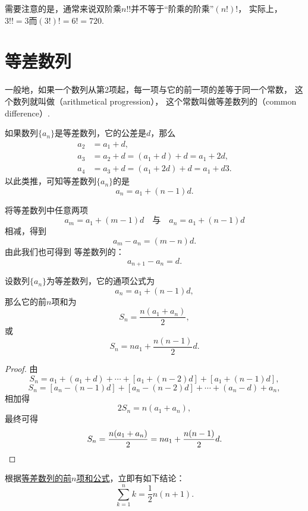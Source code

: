 需要注意的是，通常来说双阶乘\(n!!\)并不等于“阶乘的阶乘”\((n!)!\)，
实际上，\(3!! = 3\)而\((3!)! = 6! = 720\).

\section{等差数列}
一般地，如果一个数列从第2项起，每一项与它的前一项的差等于同一个常数，
这个数列就叫做（arithmetical progression），
这个常数叫做等差数列的（common difference）.

如果数列\(\{a_n\}\)是等差数列，它的公差是\(d\)，那么\begin{align*}
    a_2 &= a_1 + d, \\
    a_3 &= a_2 + d = (a_1 + d) + d = a_1 + 2d, \\
    a_4 &= a_3 + d = (a_1 + 2d) + d = a_1 + d3.
\end{align*}
以此类推，可知等差数列\(\{a_n\}\)的是\begin{equation}
    a_n = a_1 + (n-1) d.
\end{equation}

将等差数列中任意两项\[
    a_m = a_1 + (m-1) d
    \quad\text{与}\quad
    a_n = a_1 + (n-1) d
\]相减，得到\[
    a_m - a_n = (m-n) d.
\]
由此我们也可得到%
等差数列的：\begin{equation}
    a_{n+1} - a_n = d.
\end{equation}

\begin{property}[等差数列求和]
设数列\(\{a_n\}\)为等差数列，它的通项公式为\[
    a_n = a_1 + (n-1) d,
\]
那么它的前\(n\)项和为\begin{equation}\label{equation:数列.等差数列的前n项和1}
    S_n = \frac{n(a_1 + a_n)}{2},
\end{equation}
或\begin{equation}\label{equation:数列.等差数列的前n项和2}
    S_n = n a_1 + \frac{n(n-1)}{2} d.
\end{equation}
\begin{proof}
由\[
    S_n = a_1 + (a_1 + d) + \dotsb + [a_1 + (n-2)d] + [a_1 + (n-1)d],
\]\[
    S_n = [a_n - (n-1)d] + [a_n - (n-2)d] + \dotsb + (a_n - d) + a_n,
\]相加得\[
    2 S_n = n(a_1 + a_n),
\]最终可得\[
    S_n = \frac{n(a_1 + a_n)}{2} = n a_1 + \frac{n(n-1)}{2} d.
    \qedhere
\]
\end{proof}
\end{property}

根据\hyperref[equation:数列.等差数列的前n项和1]{等差数列的前\(n\)项和公式}，立即有如下结论：
\begin{equation}
    \sum_{k=1}^n k = \frac{1}{2} n(n+1).
\end{equation}

